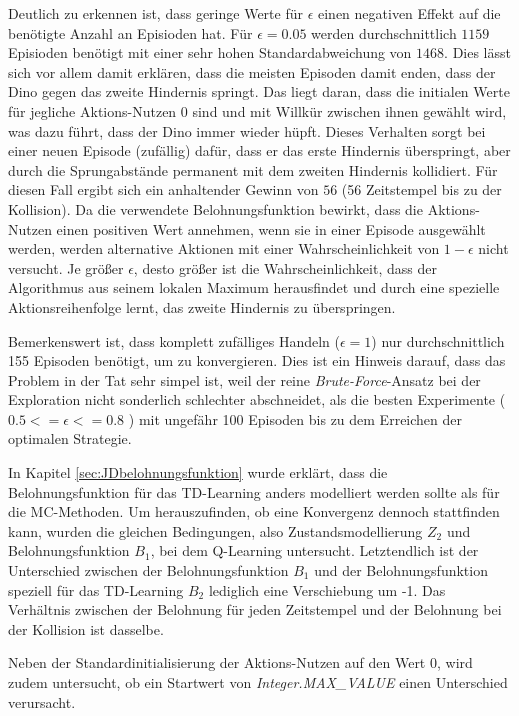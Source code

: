 Deutlich zu erkennen ist, dass geringe Werte für $\epsilon$ einen negativen Effekt auf die benötigte Anzahl an Episioden hat. Für $\epsilon = 0.05$ werden durchschnittlich $1159$ Episioden benötigt mit einer sehr hohen Standardabweichung von $1468$. Dies lässt sich vor allem damit erklären, dass die meisten Episoden damit enden, dass der Dino gegen das zweite Hindernis springt. Das liegt daran, dass die initialen Werte für jegliche Aktions-Nutzen 0 sind und mit Willkür zwischen ihnen gewählt wird, was dazu führt, dass der Dino immer wieder hüpft. Dieses Verhalten sorgt bei einer neuen Episode (zufällig) dafür, dass er das erste Hindernis überspringt, aber durch die Sprungabstände permanent mit dem zweiten Hindernis kollidiert. Für diesen Fall ergibt sich ein anhaltender Gewinn von $56$ (56 Zeitstempel bis zu der Kollision). Da die verwendete Belohnungsfunktion bewirkt, dass die Aktions-Nutzen einen positiven Wert annehmen, wenn sie in einer Episode ausgewählt werden, werden alternative Aktionen mit einer Wahrscheinlichkeit von $1-\epsilon$ nicht versucht. Je größer $\epsilon$, desto größer ist die Wahrscheinlichkeit, dass der Algorithmus aus seinem lokalen Maximum herausfindet und durch eine spezielle Aktionsreihenfolge lernt, das zweite Hindernis zu überspringen.
\par
Bemerkenswert ist, dass komplett zufälliges Handeln ($\epsilon = 1$) nur durchschnittlich 155 Episoden benötigt, um zu konvergieren. Dies ist ein Hinweis darauf, dass das Problem in der Tat sehr simpel ist, weil der reine \textit{Brute-Force}-Ansatz bei der Exploration nicht sonderlich schlechter abschneidet, als die besten Experimente ($0.5 <= \epsilon <= 0.8$ ) mit ungefähr 100 Episoden bis zu dem Erreichen der optimalen Strategie.

\par 
In Kapitel \ref{sec:JDbelohnungsfunktion} wurde erklärt, dass die Belohnungsfunktion für das TD-Learning anders modelliert werden sollte als für die MC-Methoden. Um herauszufinden, ob eine Konvergenz dennoch stattfinden kann, wurden die gleichen Bedingungen, also Zustandsmodellierung $Z_2$ und Belohnungsfunktion $B_1$, bei dem Q-Learning untersucht. Letztendlich ist der Unterschied zwischen der Belohnungsfunktion $B_1$ und der Belohnungsfunktion speziell für das TD-Learning $B_2$ lediglich eine Verschiebung um -1. Das Verhältnis zwischen der Belohnung für jeden Zeitstempel und der Belohnung bei der Kollision ist dasselbe.
\par 
Neben der Standardinitialisierung der Aktions-Nutzen auf den Wert 0, wird zudem untersucht, ob ein Startwert von \textit{Integer.MAX\_VALUE} einen Unterschied verursacht.

